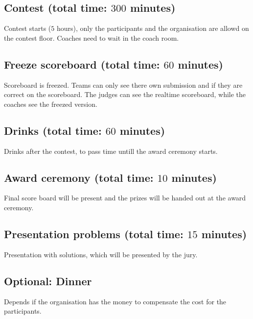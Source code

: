 \subsection{Contest (total time: $300$ minutes)}
Contest starts ($5$ hours), only the participants and the organisation are allowd on the contest floor. Coaches need to wait in the coach room.

\subsection{Freeze scoreboard (total time: $60$ minutes)}
Scoreboard is freezed. Teams can only see there own submission and if they are correct on the scoreboard. The judges can see the realtime scoreboard, while the coaches see the freezed version.

\subsection{Drinks (total time: $60$ minutes)}
Drinks after the contest, to pass time untill the award ceremony starts.

\subsection{Award ceremony (total time: $10$ minutes)}\label{awardCeremony}
Final score board will be present and the prizes will be handed out at the award ceremony.

\subsection{Presentation problems (total time: $15$ minutes)}
Presentation with solutions, which will be presented by the jury.

\subsection{Optional: Dinner}
Depends if the organisation has the money to compensate the cost for the participants.
